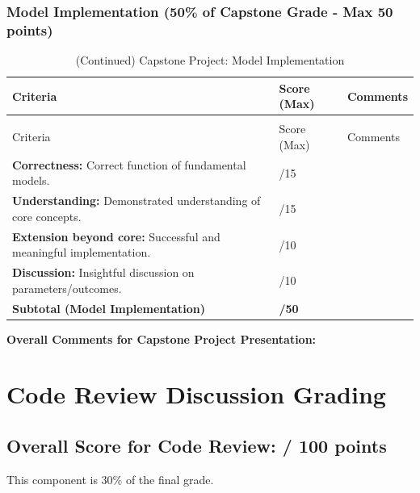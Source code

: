 \documentclass{article}
\begin{document}
\subsubsection*{Model Implementation (50\% of Capstone Grade - Max 50 points)}
\begin{longtable}{@{}>{\RaggedRight\arraybackslash}p{} >{\centering\arraybackslash}p{} >{\RaggedRight\arraybackslash}p{}@{}}
\toprule
Criteria & Score (Max) & Comments \\
\midrule
\endfirsthead
\caption[]{(Continued) Capstone Project: Model Implementation} \\
\toprule
Criteria & Score (Max) & Comments \\
\midrule
\endhead
\bottomrule
\endfoot
\textbf{Correctness:} Correct function of fundamental models. & /15 & \\
\addlinespace
\textbf{Understanding:} Demonstrated understanding of core concepts. & /15 & \\
\addlinespace
\textbf{Extension beyond core:} Successful and meaningful implementation. & /10 & \\
\addlinespace
\textbf{Discussion:} Insightful discussion on parameters/outcomes. & /10 & \\
\midrule
\textbf{Subtotal (Model Implementation)} & \textbf{/50} & \\
\end{longtable}

\textbf{Overall Comments for Capstone Project Presentation:}

\newpage
\section{Code Review Discussion Grading}
\subsection*{Overall Score for Code Review: \underline{\hspace{1.5cm}} / 100 points}
This component is 30\% of the final grade.
\end{document}
